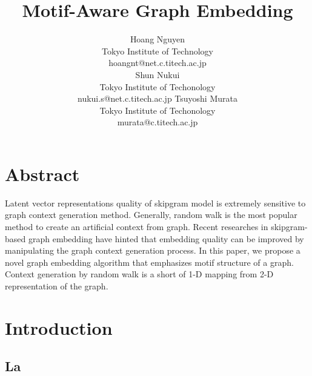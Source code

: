 \documentclass[letterpaper]{article}
\title{Motif-Aware Graph Embedding}
\author{
    Hoang Nguyen \\
    Tokyo Institute of Technology \\
    hoangnt@net.c.titech.ac.jp \\
    \And 
    Shun Nukui \\ 
    Tokyo Institute of Techonology \\
    nukui.s@net.c.titech.ac.jp 
    \And 
    Tsuyoshi Murata \\
    Tokyo Institute of Techonology \\
    murata@c.titech.ac.jp 
}
\begin{document}
    \maketitle

    \section{Abstract}
        Latent vector representations quality of skipgram model is extremely sensitive to 
        graph context generation method. Generally, random walk is the most popular method
        to create an artificial context from graph. Recent researches in skipgram-based 
        graph embedding have hinted that embedding quality can be improved by manipulating
        the graph context generation process. In this paper, we propose a novel graph embedding
        algorithm that emphasizes motif structure of a graph. Context generation by random walk
        is a short of 1-D mapping from 2-D representation of the graph.

    \setcounter{secnumdepth}{2}
    \section{Introduction}
        \subsection{La}
\end{document}

